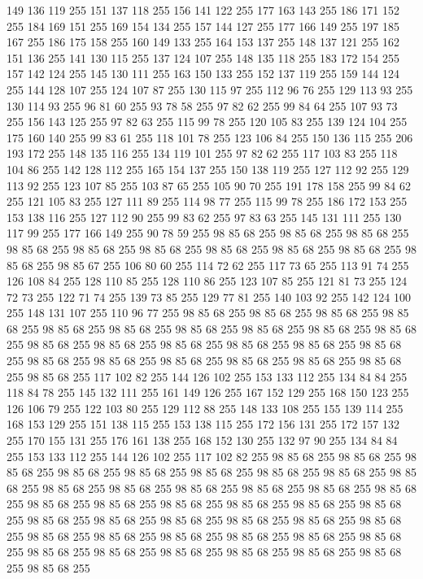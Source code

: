 149 136 119 255 151 137 118 255 156 141 122 255 177 163 143 255 186 171 152 255 184 169 151 255 169 154 134 255 157 144 127 255 177 166 149 255 197 185 167 255 186 175 158 255 160 149 133 255 164 153 137 255 148 137 121 255 162 151 136 255 141 130 115 255 137 124 107 255 148 135 118 255 183 172 154 255 157 142 124 255 145 130 111 255 163 150 133 255 152 137 119 255 159 144 124 255 144 128 107 255 124 107 87 255 130 115 97 255 112 96 76 255 129 113 93 255 130 114 93 255 96 81 60 255 93 78 58 255 97 82 62 255 99 84 64 255 107 93 73 255 156 143 125 255 97 82 63 255 115 99 78 255 120 105 83 255 139 124 104 255 175 160 140 255 99 83 61 255 118 101 78 255 123 106 84 255 150 136 115 255 206 193 172 255 148 135 116 255 134 119 101 255 97 82 62 255 117 103 83 255 118 104 86 255 142 128 112 255 165 154 137 255 150 138 119 255 127 112 92 255 129 113 92 255 123 107 85 255 103 87 65 255 105 90 70 255 191 178 158 255 99 84 62 255 121 105 83 255 127 111 89 255 114 98 77 255
115 99 78 255 186 172 153 255 153 138 116 255 127 112 90 255 99 83 62 255 97 83 63 255 145 131 111 255 130 117 99 255 177 166 149 255 90 78 59 255 98 85 68 255 98 85 68 255 98 85 68 255 98 85 68 255 98 85 68 255 98 85 68 255 98 85 68 255 98 85 68 255 98 85 68 255 98 85 68 255 98 85 67 255 106 80 60 255 114 72 62 255 117 73 65 255 113 91 74 255 126 108 84 255 128 110 85 255 128 110 86 255 123 107 85 255 121 81 73 255 124 72 73 255 122 71 74 255 139 73 85 255 129 77 81 255 140 103 92 255 142 124 100 255 148 131 107 255 110 96 77 255 98 85 68 255 98 85 68 255 98 85 68 255 98 85 68 255 98 85 68 255 98 85 68 255 98 85 68 255 98 85 68 255 98 85 68 255 98 85 68 255 98 85 68 255 98 85 68 255 98 85 68 255 98 85 68 255 98 85 68 255 98 85 68 255 98 85 68 255 98 85 68 255 98 85 68 255 98 85 68 255 98 85 68 255 98 85 68 255 98 85 68 255 117 102 82 255 144 126 102 255 153 133 112 255
134 84 84 255 118 84 78 255 145 132 111 255 161 149 126 255 167 152 129 255 168 150 123 255 126 106 79 255 122 103 80 255 129 112 88 255 148 133 108 255 155 139 114 255 168 153 129 255 151 138 115 255 153 138 115 255 172 156 131 255 172 157 132 255 170 155 131 255 176 161 138 255 168 152 130 255 132 97 90 255 134 84 84 255 153 133 112 255 144 126 102 255 117 102 82 255 98 85 68 255 98 85 68 255 98 85 68 255 98 85 68 255 98 85 68 255 98 85 68 255 98 85 68 255 98 85 68 255 98 85 68 255 98 85 68 255 98 85 68 255 98 85 68 255 98 85 68 255 98 85 68 255 98 85 68 255 98 85 68 255 98 85 68 255 98 85 68 255 98 85 68 255 98 85 68 255 98 85 68 255 98 85 68 255 98 85 68 255 98 85 68 255 98 85 68 255 98 85 68 255 98 85 68 255 98 85 68 255 98 85 68 255 98 85 68 255 98 85 68 255 98 85 68 255 98 85 68 255 98 85 68 255 98 85 68 255 98 85 68 255 98 85 68 255 98 85 68 255 98 85 68 255 98 85 68 255
